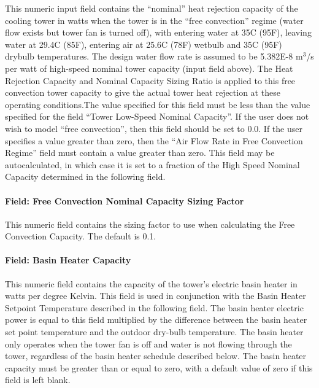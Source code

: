 This numeric input field contains the ``nominal'' heat rejection capacity of the cooling tower in watts when the tower is in the ``free convection'' regime (water flow exists but tower fan is turned off), with entering water at 35C (95F), leaving water at 29.4C (85F), entering air at 25.6C (78F) wetbulb and 35C (95F) drybulb temperatures. The design water flow rate is assumed to be 5.382E-8 m\(^{3}\)/s per watt of high-speed nominal tower capacity (input field above). The Heat Rejection Capacity and Nominal Capacity Sizing Ratio is applied to this free convection tower capacity to give the actual tower heat rejection at these operating conditions.The value specified for this field must be less than the value specified for the field ``Tower Low-Speed Nominal Capacity''. If the user does not wish to model ``free convection'', then this field should be set to 0.0. If the user specifies a value greater than zero, then the ``Air Flow Rate in Free Convection Regime'' field must contain a value greater than zero. This field may be autocalculated, in which case it is set to a fraction of the High Speed Nominal Capacity determined in the following field.

\paragraph{Field: Free Convection Nominal Capacity Sizing Factor}\label{field-free-convection-nominal-capacity-sizing-factor-1}

This numeric field contains the sizing factor to use when calculating the Free Convection Capacity. The default is 0.1.

\paragraph{Field: Basin Heater Capacity}\label{field-basin-heater-capacity-1}

This numeric field contains the capacity of the tower's electric basin heater in watts per degree Kelvin. This field is used in conjunction with the Basin Heater Setpoint Temperature described in the following field. The basin heater electric power is equal to this field multiplied by the difference between the basin heater set point temperature and the outdoor dry-bulb temperature. The basin heater only operates when the tower fan is off and water is not flowing through the tower, regardless of the basin heater schedule described below. The basin heater capacity must be greater than or equal to zero, with a default value of zero if this field is left blank.

